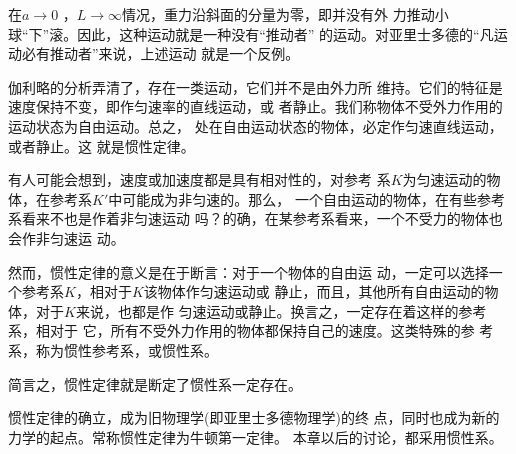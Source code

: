 在$ a \rightarrow 0$  ，$L \rightarrow \infty$情况，重力沿斜面的分量为零，即并没有外
力推动小球“下”滚。因此，这种运动就是一种没有“推动者”
的运动。对亚里士多德的“凡运动必有推动者”来说，上述运动
就是一个反例。

伽利略的分析弄清了，存在一类运动，它们并不是由外力所
维持。它们的特征是速度保持不变，即作匀速率的直线运动，或
者静止。我们称物体不受外力作用的运动状态为自由运动。总之，
处在自由运动状态的物体，必定作匀速直线运动，或者静止。这
就是惯性定律。

有人可能会想到，速度或加速度都是具有相对性的，对参考
系$K$为匀速运动的物体，在参考系$K'$中可能成为非匀速的。那么，
一个自由运动的物体，在有些参考系看来不也是作着非匀速运动
吗？的确，在某参考系看来，一个不受力的物体也会作非匀速运
动。

然而，惯性定律的意义是在于断言：对于一个物体的自由运
动，一定可以选择一个参考系$K$，相对于$K$该物体作匀速运动或
静止，而且，其他所有自由运动的物体，对于$K$来说，也都是作
匀速运动或静止。换言之，一定存在着这样的参考系，相对于
它，所有不受外力作用的物体都保持自己的速度。这类特殊的参
考系，称为惯性参考系，或惯性系。

简言之，惯性定律就是断定了惯性系一定存在。

惯性定律的确立，成为旧物理学(即亚里士多德物理学)的终
点，同时也成为新的力学的起点。常称惯性定律为牛顿第一定律。
本章以后的讨论，都采用惯性系。